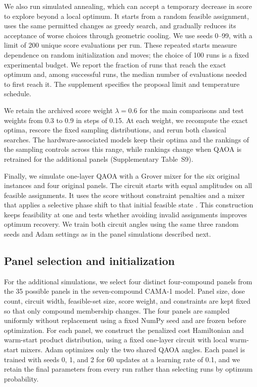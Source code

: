 \documentclass[utf8]{FrontiersinHarvard}
\begin{document}
We also run simulated annealing, which can accept a temporary decrease in score to explore beyond a local optimum. It starts from a random feasible assignment, uses the same permitted changes as greedy search, and gradually reduces its acceptance of worse choices through geometric cooling. We use seeds 0--99, with a limit of 200 unique score evaluations per run. These repeated starts measure dependence on random initialization and moves; the choice of 100 runs is a fixed experimental budget. We report the fraction of runs that reach the exact optimum and, among successful runs, the median number of evaluations needed to first reach it. The supplement specifies the proposal limit and temperature schedule.

We retain the archived score weight $\lambda=0.6$ for the main comparisons and test weights from 0.3 to 0.9 in steps of 0.15. At each weight, we recompute the exact optima, rescore the fixed sampling distributions, and rerun both classical searches. The hardware-associated models keep their optima and the rankings of the sampling controls across this range, while rankings change when QAOA is retrained for the additional panels (Supplementary Table~S9).

Finally, we simulate one-layer QAOA with a Grover mixer for the six original instances and four original panels. The circuit starts with equal amplitudes on all feasible assignments. It uses the score without constraint penalties and a mixer that applies a selective phase shift to that initial feasible state \citep{bartschi2020}. This construction keeps feasibility at one and tests whether avoiding invalid assignments improves optimum recovery. We train both circuit angles using the same three random seeds and Adam settings as in the panel simulations described next.

\subsection{Panel selection and initialization}
For the additional simulations, we select four distinct four-compound panels from the 35 possible panels in the seven-compound CAMA-1 model. Panel size, dose count, circuit width, feasible-set size, score weight, and constraints are kept fixed so that only compound membership changes. The four panels are sampled uniformly without replacement using a fixed NumPy seed \citep{numpy2026} and are frozen before optimization. For each panel, we construct the penalized cost Hamiltonian and warm-start product distribution, using a fixed one-layer circuit with local warm-start mixers. Adam optimizes only the two shared QAOA angles. Each panel is trained with seeds 0, 1, and 2 for 60 updates at a learning rate of 0.1, and we retain the final parameters from every run rather than selecting runs by optimum probability.
\end{document}
